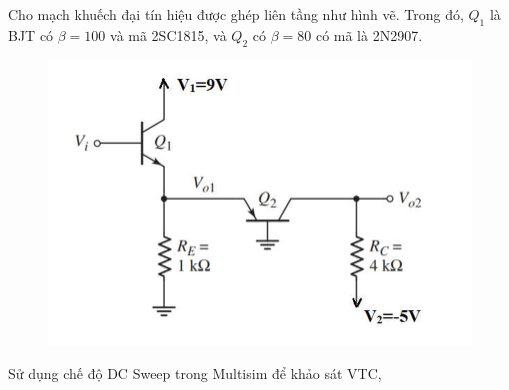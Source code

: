 
Cho mạch khuếch đại tín hiệu được ghép liên tầng như hình vẽ. Trong đó, $Q_{1}$ là BJT có $\beta = 100$ và mã 2SC1815, và $Q_{2}$ có $\beta = 80$ có mã là 2N2907.

\begin{figure}[H]
	\centering
	\includegraphics[width=.8\linewidth]{./my-chapters/my-images/Question5/debai.png}
\end{figure}


Sử dụng chế độ DC Sweep trong Multisim để khảo sát VTC,

